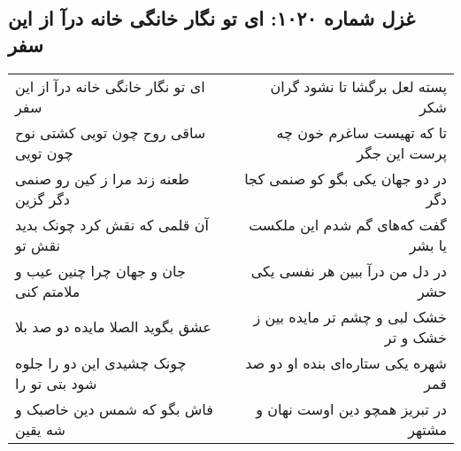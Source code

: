 \begin{center}
\section*{غزل شماره ۱۰۲۰: ای تو نگار خانگی خانه درآ از این سفر}
\label{sec:1020}
\begin{longtable}{l p{0.5cm} r}
ای تو نگار خانگی خانه درآ از این سفر
&&
پسته لعل برگشا تا نشود گران شکر
\\
ساقی روح چون تویی کشتی نوح چون تویی
&&
تا که تهیست ساغرم خون چه پرست این جگر
\\
طعنه زند مرا ز کین رو صنمی دگر گزین
&&
در دو جهان یکی بگو کو صنمی کجا دگر
\\
آن قلمی که نقش کرد چونک بدید نقش تو
&&
گفت که‌های گم شدم این ملکست یا بشر
\\
جان و جهان چرا چنین عیب و ملامتم کنی
&&
در دل من درآ ببین هر نفسی یکی حشر
\\
عشق بگوید الصلا مایده دو صد بلا
&&
خشک لبی و چشم تر مایده بین ز خشک و تر
\\
چونک چشیدی این دو را جلوه شود بتی تو را
&&
شهره یکی ستاره‌ای بنده او دو صد قمر
\\
فاش بگو که شمس دین خاصبک و شه یقین
&&
در تبریز همچو دین اوست نهان و مشتهر
\\
\end{longtable}
\end{center}
